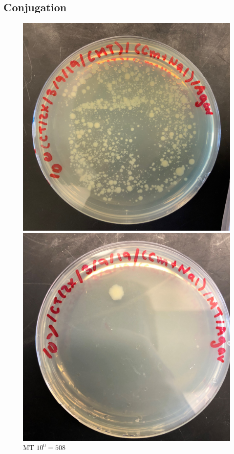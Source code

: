 \documentclass{article}
\begin{document}
		\subsection{Conjugation}
			\begin{figure}[H]
				\begin{minipage}[t]{0.24\textwidth}
					\centering
					\includegraphics[width = 0.9\linewidth]{Mate_0_NalCm.jpg}
					\caption{MT $10^{0} = 508$}
				\end{minipage}
				\begin{minipage}[t]{0.24\textwidth}
					\centering
					\includegraphics[width = 0.9\linewidth]{Mate_1_NalCm.jpg}

\end{minipage}
\end{figure}
\end{document}
